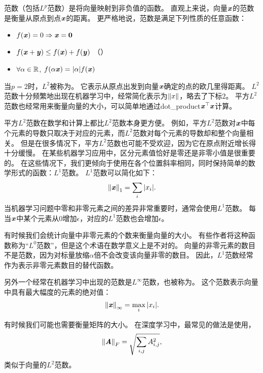 

范数（包括$L^p$范数）是将向量映射到非负值的函数。
直观上来说，向量$\boldsymbol{\mathit{x}}$的范数是衡量从原点到点$\boldsymbol{\mathit{x}}$的距离。
更严格地说，范数是满足下列性质的任意函数：
\begin{itemize}
\item $f(\boldsymbol{\mathit{x}}) = 0 \Rightarrow \boldsymbol{\mathit{x}} = \mathbf{0}$ 
\item $f(\boldsymbol{\mathit{x}} + \boldsymbol{\mathit{y}}) \leq f(\boldsymbol{\mathit{x}}) + f(\boldsymbol{\mathit{y}})$ （）
\item $\forall \alpha \in \mathbb{R}$, $f(\alpha \boldsymbol{\mathit{x}}) = |\alpha| f(\boldsymbol{\mathit{x}})$
\end{itemize}


当$p=2$时，$L^2$被称为。
它表示从原点出发到向量$\boldsymbol{\mathit{x}}$确定的点的欧几里得距离。
$L^2$范数十分频繁地出现在机器学习中，经常简化表示为$\left\lVert x\right\rVert$，略去了下标$2$。
平方$L^2$范数也经常用来衡量向量的大小，可以简单地通过\gls{dot_product}$\boldsymbol{\mathit{x}}^\top\boldsymbol{\mathit{x}}$计算。


平方$L^2$范数在数学和计算上都比$L^2$范数本身更方便。
例如，平方$L^2$范数对$\boldsymbol{\mathit{x}}$中每个元素的导数只取决于对应的元素，而$L^2$范数对每个元素的导数却和整个向量相关。
但是在很多情况下，平方$L^2$范数也可能不受欢迎，因为它在原点附近增长得十分缓慢。
在某些机器学习应用中，区分元素值恰好是零还是非零小值是很重要的。
在这些情况下，我们更倾向于使用在各个位置斜率相同，同时保持简单的数学形式的函数：$L^1$范数。
$L^1$范数可以简化如下：
\begin{equation}
    \left\lVert\boldsymbol{\mathit{x}}\right\rVert_1 = \sum_i  |x_i|.
\end{equation}
当机器学习问题中零和非零元素之间的差异非常重要时，通常会使用$L^1$范数。
每当$\boldsymbol{\mathit{x}}$中某个元素从$0$增加$\epsilon$，对应的$L^1$范数也会增加$\epsilon$。


有时候我们会统计向量中非零元素的个数来衡量向量的大小。
有些作者将这种函数称为``$L^0$范数''，但是这个术语在数学意义上是不对的。
向量的非零元素的数目不是范数，因为对标量放缩$\alpha$倍不会改变该向量非零的数目。
因此，$L^1$范数经常作为表示非零元素数目的替代函数。





另外一个经常在机器学习中出现的范数是$L^\infty$范数，也被称为。
这个范数表示向量中具有最大幅度的元素的绝对值：
\begin{equation}
    \left\lVert\boldsymbol{\mathit{x}}\right\rVert_\infty = \max_i |x_i|.
\end{equation}


有时候我们可能也需要衡量矩阵的大小。
在深度学习中，最常见的做法是使用，
\begin{equation}
    \left\lVert\boldsymbol{\mathit{A}}\right\rVert_F = \sqrt{\sum_{i,j} A_{i,j}^2}, 
\end{equation}
类似于向量的$L^2$范数。


